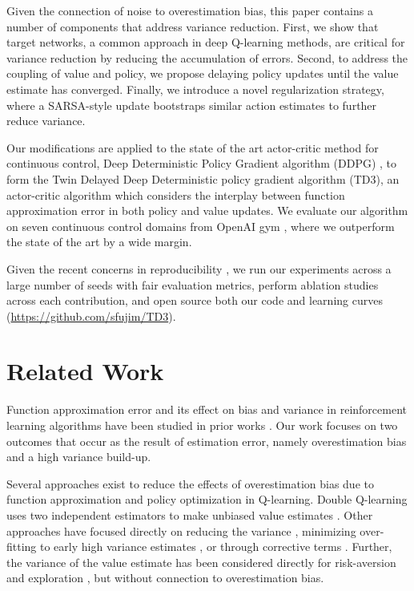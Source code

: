 \documentclass{article}
\begin{document}
Given the connection of noise to overestimation bias, this paper contains a number of components that address variance reduction. First, we show that target networks, a common approach in deep Q-learning methods, are critical for variance reduction by reducing the accumulation of errors. Second, to address the coupling of value and policy, we propose delaying policy updates until the value estimate has converged. Finally, we introduce a novel regularization strategy, where a SARSA-style update bootstraps similar action estimates to further reduce variance. 

Our modifications are applied to the state of the art actor-critic method for continuous control, Deep Deterministic Policy Gradient algorithm (DDPG) \cite{DDPG}, to form the Twin Delayed Deep Deterministic policy gradient algorithm (TD3), an actor-critic algorithm which considers the interplay between function approximation error in both policy and value updates. We evaluate our algorithm on seven continuous control domains from OpenAI gym \cite{OpenAIGym}, where we outperform the state of the art by a wide margin.

Given the recent concerns in reproducibility \cite{hendersonRL2017}, we run our experiments across a large number of seeds with fair evaluation metrics, perform ablation studies across each contribution, and open source both our code and learning curves (\url{https://github.com/sfujim/TD3}). 

\section{Related Work}

Function approximation error and its effect on bias and variance in reinforcement learning algorithms have been studied in prior works \cite{pendrith1997estimator, mannor2007bias}. Our work focuses on two outcomes that occur as the result of estimation error, namely overestimation bias and a high variance build-up.  

Several approaches exist to reduce the effects of overestimation bias due to function approximation and policy optimization in Q-learning. Double Q-learning uses two independent estimators to make unbiased value estimates \cite{hasselt2010double, DoubleDQN}. Other approaches have focused directly on reducing the variance \cite{AVGDQN}, minimizing over-fitting to early high variance estimates \cite{fox2015glearning}, or through corrective terms \cite{lee2013biascor}. Further, the variance of the value estimate has been considered directly for risk-aversion \cite{mannor2011mean} and exploration \cite{UncertaintyBellman}, but without connection to overestimation bias. 
\end{document}
